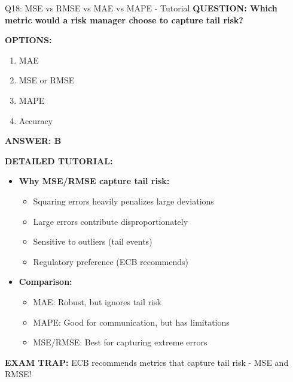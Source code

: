 \documentclass[8pt]{beamer}
\begin{document}
	\begin{frame}{Q18: MSE vs RMSE vs MAE vs MAPE - Tutorial}
		\fontsize{6.5}{7.5}\selectfont
		\textbf{QUESTION: Which metric would a risk manager choose to capture tail risk?}
		
		\vspace{0.1cm}
		\textbf{OPTIONS:}
		\begin{enumerate}
			\item MAE
			\item MSE or RMSE
			\item MAPE
			\item Accuracy
		\end{enumerate}
		
		\vspace{0.1cm}
		\textcolor{myblue}{\textbf{ANSWER: B}}
		
		\vspace{0.1cm}
		\textbf{DETAILED TUTORIAL:}
		\begin{itemize}
			\item \textbf{Why MSE/RMSE capture tail risk:}
			\begin{itemize}
				\item Squaring errors heavily penalizes large deviations
				\item Large errors contribute disproportionately
				\item Sensitive to outliers (tail events)
				\item Regulatory preference (ECB recommends)
			\end{itemize}
			\item \textbf{Comparison:}
			\begin{itemize}
				\item MAE: Robust, but ignores tail risk
				\item MAPE: Good for communication, but has limitations
				\item MSE/RMSE: Best for capturing extreme errors
			\end{itemize}
		\end{itemize}
		
		\textcolor{myred}{\textbf{EXAM TRAP:}} ECB recommends metrics that \textcolor{myblue}{capture tail risk} - MSE and RMSE!
	\end{frame}
	
\end{document}
